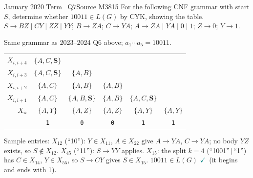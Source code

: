 \documentclass[11pt,a4paper]{article}
\newcommand{\ok}{\textcolor{teal}{\ensuremath{\checkmark}}}
\begin{document}
\begin{question}{January 2020 Term \textbullet\ Q7}{Source M38}{15}
For the following CNF grammar with start $S$, determine whether $10011\in L(G)$ by CYK, showing the table.
$S\to BZ\mid CY\mid ZZ\mid YY$; $B\to ZA$; $C\to YA$; $A\to ZA\mid YA\mid0\mid1$; $Z\to0$; $Y\to1$.
\end{question}
\begin{solution}
Same grammar as 2023--2024 Q6 above; $a_1\cdots a_5=10011$.
\begin{center}\small\renewcommand{\arraystretch}{1.25}\begin{tabular}{r|ccccc}\toprule
$X_{i,i+4}$ & $\{A,C,\mathbf{S}\}$ &  &  &  & \\
$X_{i,i+3}$ & $\{A,C,\mathbf{S}\}$ & $\{A,B\}$ &  &  & \\
$X_{i,i+2}$ & $\{A,C\}$ & $\{A,B\}$ & $\{A,B\}$ &  & \\
$X_{i,i+1}$ & $\{A,C\}$ & $\{A,B,\mathbf{S}\}$ & $\{A,B\}$ & $\{A,C,\mathbf{S}\}$ & \\
$X_{ii}$ & $\{A,Y\}$ & $\{A,Z\}$ & $\{A,Z\}$ & $\{A,Y\}$ & $\{A,Y\}$\\
\midrule & \texttt{1} & \texttt{0} & \texttt{0} & \texttt{1} & \texttt{1}\\\bottomrule\end{tabular}\end{center}
Sample entries: $X_{12}$ (``10''): $Y\in X_{11}$, $A\in X_{22}$ give $A\to YA$, $C\to YA$; no body $YZ$ exists, so $S\notin X_{12}$. $X_{45}$ (``11''): $S\to YY$ applies. $X_{15}$: the split $k=4$ (``1001''$\,|\,$``1'') has $C\in X_{14}$, $Y\in X_{55}$, so $S\to CY$ gives $S\in X_{15}$. \textbf{$10011\in L(G)$} \ok\ (it begins and ends with 1).
\end{solution}
\end{document}
